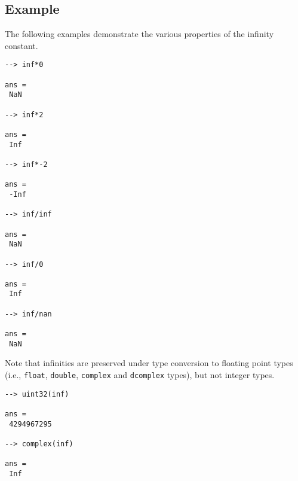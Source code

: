\subsection{Example}

The following examples demonstrate the various properties of the infinity constant.
\begin{verbatim}
--> inf*0

ans = 
 NaN 

--> inf*2

ans = 
 Inf 

--> inf*-2

ans = 
 -Inf 

--> inf/inf

ans = 
 NaN 

--> inf/0

ans = 
 Inf 

--> inf/nan

ans = 
 NaN 
\end{verbatim}
Note that infinities are preserved under type conversion to floating point types (i.e., \verb|float|, \verb|double|, \verb|complex| and \verb|dcomplex| types), but not integer  types.
\begin{verbatim}
--> uint32(inf)

ans = 
 4294967295 

--> complex(inf)

ans = 
 Inf 
\end{verbatim}
